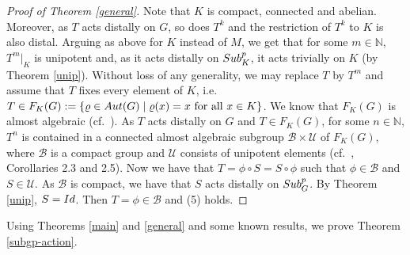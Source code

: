 \documentclass{amsart}
\numberwithin{equation}{section}
\newcommand{\Aut}{{\rm Aut}}
\newcommand{\N}{{\mathbb N}}
\newcommand{\U}{{\mathcal U}}
\newcommand{\Bc}{{\mathcal B}}
\newcommand{\spg}{{\rm Sub}^p_G}
\newcommand{\spp}{{\rm Sub}^{p}}
\newcommand{\Id}{{\rm Id}}
\theoremstyle{remark}
\begin{document}
\begin{proof}[Proof of Theorem \ref{general}]
Note that $K$ is compact, connected and abelian. Moreover, as $T$ acts distally on $G$, so does $T^k$ 
and the restriction of $T^k$ to $K$ is also distal. Arguing as above for $K$ instead of $M$, we get that for 
some $m\in\N$, $T^m|_K$ is unipotent and, as it acts distally on $\spp_K$, it acts trivially on $K$ 
(by Theorem \ref{unip}). Without loss of any generality, we may replace $T$ by $T^m$ and assume that 
$T$ fixes every element of $K$, 
i.e.\ $T\in F_K(G):=\{\varrho \in \Aut(G)\mid \varrho(x)=x \mbox{ for all } x\in K\}$. We know that $F_K(G)$ is almost 
algebraic (cf.\ \cite{DS2}). As $T$ acts distally on $G$ and $T\in F_K(G)$, for some $n\in\N$, 
$T^n$ is contained in a connected almost algebraic subgroup $\Bc\times \U$ of $F_K(G)$, where $\Bc$ 
is a compact group and $\U$ consists of unipotent elements (cf.\ \cite{Ab1}, Corollaries 2.3 and 2.5). 
Now we have that $T=\phi\circ S=S\circ\phi$ such that $\phi\in \Bc$ 
and $S\in \U$. As $\Bc$ is compact, we have that $S$ acts distally on $\spg$. 
By Theorem \ref{unip}, $S=\Id$. Then $T=\phi\in\Bc$ and (5) holds. 
\end{proof}

Using Theorems \ref{main} and \ref{general} and some known results, we prove Theorem \ref{subgp-action}.
\end{document}
